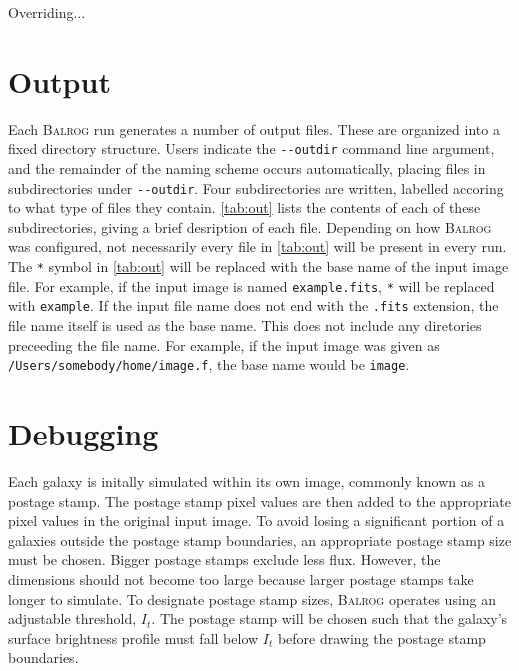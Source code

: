 \documentclass[12pt]{book}
\newcommand{\codett}[1]{\lstinline{#1}}
\newcommand{\balrog}{\textsc{Balrog}}
\newcommand{\opt}[1]{\codett{--#1}}
\begin{document}
Overriding...

\chapter{Output}
\label{sec:out}
Each \balrog{} run generates a number of output files. 
These are organized into a fixed directory structure.
Users indicate the \opt{outdir} command line argument, and
the remainder of the naming scheme occurs automatically,
placing files in subdirectories under \opt{outdir}.
Four subdirectories are written, labelled accoring to what
type of files they contain. \autoref{tab:out}
lists the contents of each of these subdirectories,
giving a brief desription of each file. Depending on how
\balrog{} was configured, not necessarily every file
in \autoref{tab:out} will be present in every run.
The \codett{*} symbol in \autoref{tab:out} will be replaced with
the base name of the input image file. For example,
if the input image is named \codett{example.fits},
\codett{*} will be replaced with \codett{example}.
If the input file name does not end with the \codett{.fits}
extension, the file name itself is used as the base name.
This does not include any diretories preceeding the file name.
For example, if the input image was given as
\codett{/Users/somebody/home/image.f}, the
base name would be \codett{image}.

\outtab{}

\chapter{Debugging}
\label{sec:debug}

Each galaxy is initally simulated within its own image, commonly known as a postage stamp.
The postage stamp pixel values are then added to the appropriate pixel values in the original input image.
To avoid losing a significant portion of a galaxies outside the postage stamp boundaries,
an appropriate postage stamp size must be chosen. 
Bigger postage stamps exclude less flux.
However, the dimensions should not become too large because
larger postage stamps take longer to simulate.
To designate postage stamp sizes, \balrog{} operates using an adjustable threshold, $I_t$.
The postage stamp will be chosen such that the galaxy's surface brightness profile
must fall below $I_t$ before drawing the postage stamp boundaries.
\end{document}
